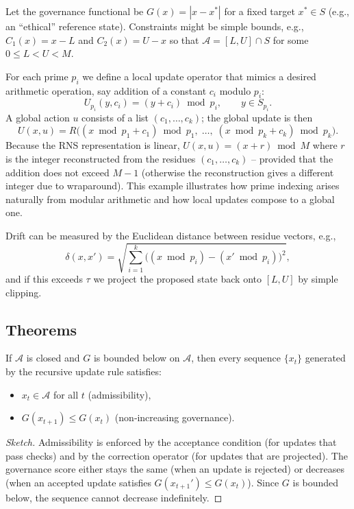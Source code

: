 \documentclass[12pt]{article}
\begin{document}
Let the governance functional be \(G(x)=|x - x^*|\) for a fixed target \(x^*\in S\) (e.g., an “ethical” reference state).  
Constraints might be simple bounds, e.g., \(C_1(x)=x - L\) and \(C_2(x)=U - x\) so that \(\mathcal{A}=[L,U]\cap S\) for some \(0\le L<U<M\).

For each prime \(p_i\) we define a local update operator that mimics a desired arithmetic operation, say addition of a constant \(c_i\) modulo \(p_i\):
\[
U_{p_i}(y,c_i) = (y + c_i) \bmod p_i,\qquad y\in S_{p_i}.
\]
A global action \(u\) consists of a list \((c_1,\dots,c_k)\); the global update is then
\[
U(x,u) = R\bigl( (x\bmod p_1 + c_1)\bmod p_1,\; \dots,\; (x\bmod p_k + c_k)\bmod p_k \bigr).
\]
Because the RNS representation is linear, \(U(x,u) = (x + r) \bmod M\) where \(r\) is the integer reconstructed from the residues \((c_1,\dots,c_k)\) – provided that the addition does not exceed \(M-1\) (otherwise the reconstruction gives a different integer due to wraparound). This example illustrates how prime indexing arises naturally from modular arithmetic and how local updates compose to a global one.

Drift can be measured by the Euclidean distance between residue vectors, e.g.,
\[
\delta(x,x') = \sqrt{\sum_{i=1}^k \bigl((x\bmod p_i)-(x'\bmod p_i)\bigr)^2},
\]
and if this exceeds \(\tau\) we project the proposed state back onto \([L,U]\) by simple clipping.

\subsection{Theorems}

\begin{theorem}
If \(\mathcal{A}\) is closed and \(G\) is bounded below on \(\mathcal{A}\), then every sequence \(\{x_t\}\) generated by the recursive update rule satisfies:
\begin{itemize}
\item \(x_t\in\mathcal{A}\) for all \(t\) (admissibility),
\item \(G(x_{t+1})\le G(x_t)\) (non‑increasing governance).
\end{itemize}
\end{theorem}
\begin{proof}[Sketch]
Admissibility is enforced by the acceptance condition (for updates that pass checks) and by the correction operator (for updates that are projected). The governance score either stays the same (when an update is rejected) or decreases (when an accepted update satisfies \(G(x_{t+1}')\le G(x_t)\)). Since \(G\) is bounded below, the sequence cannot decrease indefinitely. \end{proof}
\end{document}
